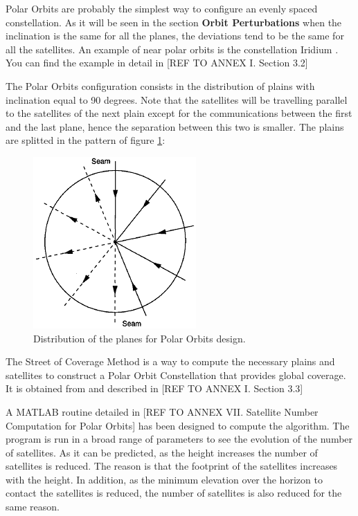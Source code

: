 Polar Orbits are probably the simplest way to configure an evenly spaced constellation. As it will be seen in the section \textbf{Orbit Perturbations} when the inclination is the same for all the planes, the deviations tend to be the same for all the satellites. An example of near polar orbits is the constellation Iridium \cite{Iridium}. You can find the example in detail in [{REF TO ANNEX I. Section 3.2}]

\begin{minipage}{0.45\textwidth}
The Polar Orbits configuration consists in the distribution of plains with inclination equal to 90 degrees. Note that the satellites will be travelling parallel to the satellites of the next plain except for the communications between the first and the last plane, hence the separation between this two is smaller. The plains are splitted in the pattern of figure \ref{fig:polardist}:
\end{minipage}
\vline
\begin{minipage}{0.45\textwidth}
\begin{figure}[H]
\begin{center}
\includegraphics[scale=0.40]{PolarOrbits/planeconfig.png}
\caption{Distribution of the planes for Polar Orbits design.}
\label{fig:polardist}
\end{center}
\end{figure}

\end{minipage}

The Street of Coverage Method is a way to compute the necessary plains and satellites to construct a Polar Orbit Constellation that provides global coverage. It is obtained from 
\cite{Chobotov2002} and described in 
[{REF TO ANNEX I. Section 3.3}]

A MATLAB routine detailed in [{REF TO ANNEX VII. Satellite Number Computation for Polar Orbits}] has been designed to compute the  algorithm. The program is run in a broad range of parameters to see the evolution of the number of satellites. As it can be predicted, as the height increases the number of satellites is reduced. The reason is that the footprint of the satellites increases with the height. In addition, as the minimum elevation over the horizon to contact the satellites is reduced, the number of satellites is also reduced for the same reason. 

